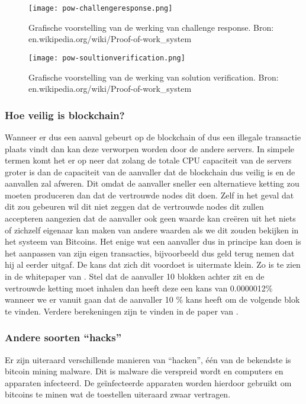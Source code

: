 \begin{figure}
	\texttt{[image: pow-challengeresponse.png]}
	\caption{Grafische voorstelling van de werking van challenge response. Bron: en.wikipedia.org/wiki/Proof-of-work\_system}
	\label{fig:pow-challengeresponse}
\end{figure}

\begin{figure}
	\texttt{[image: pow-soultionverification.png]}
	\caption{Grafische voorstelling van de werking van solution verification. Bron: en.wikipedia.org/wiki/Proof-of-work\_system}
	\label{fig:pow-solutionverification}
\end{figure}

\subsubsection{Hoe veilig is blockchain?}
\label{sec:hoeveiligisblockchain}
Wanneer er dus een aanval gebeurt op de blockchain of dus een illegale transactie plaats vindt dan kan deze verworpen worden door de andere servers. In simpele termen komt het er op neer dat zolang de totale CPU capaciteit van de servers groter is dan de capaciteit van de aanvaller dat de blockchain dus veilig is en de aanvallen zal afweren. Dit omdat de aanvaller sneller een alternatieve ketting zou moeten produceren  dan dat de vertrouwde nodes dit doen. Zelf in het geval dat dit zou gebeuren wil dit niet zeggen dat de vertrouwde nodes dit zullen accepteren aangezien dat de aanvaller ook geen waarde kan creëren uit het niets of zichzelf eigenaar kan maken van andere waarden als we dit zouden bekijken in het systeem van Bitcoins. Het enige wat een aanvaller dus in principe kan doen is het aanpassen van zijn eigen transacties, bijvoorbeeld dus geld terug nemen dat hij al eerder uitgaf. De kans dat zich dit voordoet is uitermate klein. Zo is te zien in de whitepaper van \textcite{Nakamoto2008}. Stel dat de aanvaller 10 blokken achter zit en de vertrouwde ketting moet inhalen dan heeft deze een kans van 0.0000012\% wanneer we er vanuit gaan dat de aanvaller 10 \% kans heeft om de volgende blok te vinden. Verdere berekeningen zijn te vinden in de paper van \autocite{Nakamoto2008}.


\subsubsection{Andere soorten ``hacks''}
Er zijn uiteraard verschillende manieren van ``hacken'', één van de bekendste is bitcoin mining malware. Dit is malware die verspreid wordt en computers en apparaten infecteerd. De geïnfecteerde apparaten worden hierdoor gebruikt om bitcoins te minen wat de toestellen uiteraard zwaar vertragen. 

